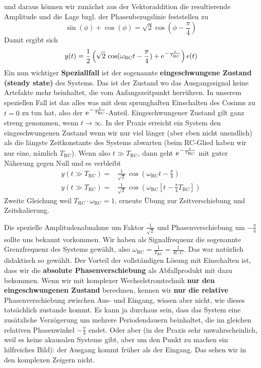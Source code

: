 \documentclass[11pt,a4paper,DIV=12]{scrartcl}
\numberwithin{equation}{section}
\numberwithin{figure}{section}
\begin{document}
\begin{Loesung}
\begin{itemize}
\begin{center}
\begin{tikzpicture}[scale=2]
\end{tikzpicture}
\end{center}
und daraus können wir zunächst aus der Vektoraddition die resultierende Amplitude und
die Lage bzgl. der Phasenbezugslinie feststellen zu
\begin{equation}
  \sin(\phi) + \cos(\phi) = \sqrt{2} \cos(\phi-\frac{\pi}{4})
\end{equation}
Damit ergibt sich
\begin{align}
  y(t) = \frac{1}{2}\left(
  \sqrt{2}\,\cos(\omega_\mathrm{RC} t - \frac{\pi}{4}) + \e^{-\frac{t}{T_\mathrm{RC}}}
  \right) \epsilon(t)
\end{align}
Ein nun wichtiger \textbf{Speziallfall} ist der sogenannte \textbf{eingeschwungene
Zustand (steady state)} des Systems.
%
Das ist der Zustand wo das Ausgangssignal keine Artefakte mehr beinhaltet, die
vom Anfangszeitpunkt herrühren.
In unserem speziellen Fall ist das alles was mit dem sprunghaften Einschalten
des Cosinus zu $t=0$ zu tun hat, also der
$\e^{-\frac{t}{T_\mathrm{RC}}}$-Anteil.
%
Eingeschwungener Zustand gilt ganz streng genommen, wenn $t\to\infty$.
In der Praxis erreicht ein System den eingeschwungenen Zustand wenn wir nur viel
länger (aber eben nicht unendlich) als die längste Zeitkonstante des Systems
abwarten (beim RC-Glied haben wir nur eine, nämlich $T_\mathrm{RC}$).
%
Wenn also $t \gg T_\mathrm{RC}$,
dann geht $\e^{-\frac{t}{T_\mathrm{RC}}}$ mit guter Näherung gegen Null
und es verbleibt
\begin{align}
  y(t \gg T_\mathrm{RC}) =& \frac{1}{\sqrt{2}} \,\cos(\omega_\mathrm{RC} t - \frac{\pi}{4})\\
  y(t \gg T_\mathrm{RC}) =& \frac{1}{\sqrt{2}} \,\cos(\omega_\mathrm{RC} \left[t - \frac{\pi}{4} T_\mathrm{RC}\right])
\end{align}
Zweite Gleichung weil $T_\mathrm{RC}\cdot \omega_\mathrm{RC} =1$, erneute Übung
zur Zeitverschiebung und Zeitskalierung.

Die spezielle Amplitudenabnahme um Faktor $\frac{1}{\sqrt{2}}$ und Phasenverschiebung
um $-\frac{\pi}{4}$ sollte uns bekannt vorkommen. Wir haben als Signalfrequenz
die sogenannte Grenzfrequenz des Systems gewählt, also
$\omega_\mathrm{RC} = \frac{1}{T_\mathrm{RC}} = \frac{1}{R \cdot C}$.
Das war natürlich didaktisch so gewählt.
%
Der Vorteil der vollständigen Lösung mit Einschalten ist, dass wir
die \textbf{absolute Phasenverschiebung} als Abfallprodukt mit dazu bekommen.
%
Wenn wir mit komplexer Wechselstromtechnik \textbf{nur den eingeschwungenen Zustand}
berechnen, kennen wir \textbf{nur die relative} Phasenverschiebung
zwischen Aus- und Eingang, wissen aber nicht, wie dieses tatsächlich zustande kommt.
Es kann ja durchaus sein, dass das System eine zusätzliche Verzögerung
um mehrere Periodendauern beinhaltet,
die im gleichen relativen Phasenwinkel $-\frac{\pi}{4}$ endet.
Oder aber (in der Praxis sehr
unwahrscheinlich, weil es keine akausalen Systeme gibt, aber um den Punkt zu machen
ein hilfreiches Bild): der Ausgang kommt früher als der Eingang.
Das sehen wir in den komplexen Zeigern nicht.


\end{itemize}
\end{Loesung}
\end{document}
